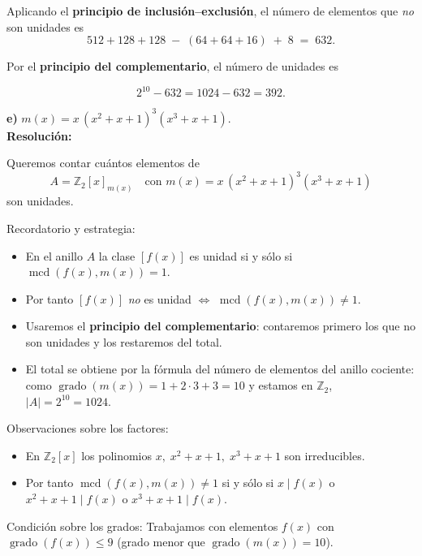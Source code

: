\documentclass[a4paper,12pt]{article}
\begin{document}
\begin{ejercicio}[title=Ejercicio 10]

Aplicando el \textbf{principio de inclusión–exclusión}, el número de elementos que \emph{no} son unidades es
\[
512 + 128 + 128 \;-\; (64 + 64 + 16) \;+\; 8 \;=\; 632.
\]

Por el \textbf{principio del complementario}, el número de unidades es

\[
2^{10} - 632 = 1024 - 632 = \boxed{392}.
\]

\vspace{0.5em}

\textbf{e)} \quad $m(x)=x\,(x^2+x+1)^3 (x^3+x+1)$. \\

\textbf{Resolución:}

Queremos contar cuántos elementos de 
\[
A=\mathbb{Z}_2[x]_{m(x)}\quad\text{con }m(x)=x\,(x^2+x+1)^3 (x^3+x+1)
\]
son unidades.

\vspace{0.5em}

Recordatorio y estrategia:
\begin{itemize}
\item En el anillo \(A\) la clase \([f(x)]\) es unidad si y sólo si \(\operatorname{mcd}(f(x),m(x))=1\).
\item Por tanto \([f(x)]\) \emph{no} es unidad \(\Longleftrightarrow\) \(\operatorname{mcd}(f(x),m(x))\neq 1\).
\item Usaremos el \textbf{principio del complementario}: contaremos primero los que no son unidades y los restaremos del total.
\item El total se obtiene por la fórmula del número de elementos del anillo cociente: como 
\(\operatorname{grado}(m(x))=1 + 2\cdot 3 + 3 = 10\) y estamos en \(\mathbb{Z}_2\), \(|A|=2^{10}=1024\).
\end{itemize}

Observaciones sobre los factores:
\begin{itemize}
\item En \(\mathbb{Z}_2[x]\) los polinomios \(x,\; x^2+x+1,\; x^3+x+1\) son irreducibles.  
\item Por tanto \(\operatorname{mcd}(f(x),m(x))\neq 1\) si y sólo si \(x\mid f(x)\) o \(x^2+x+1\mid f(x)\) o \(x^3+x+1\mid f(x)\).
\end{itemize}

Condición sobre los grados:
Trabajamos con elementos \(f(x)\) con \(\operatorname{grado}(f(x))\le 9\) (grado menor que \(\operatorname{grado}(m(x))=10\)).


\end{ejercicio}
\end{document}
